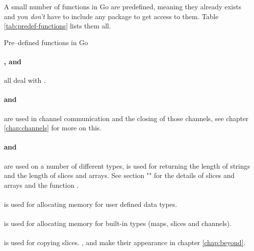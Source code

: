 A small number of functions in Go are predefined, meaning they already
exists and you \emph{don't} have to include any package to get
access to them. Table \ref{tab:predef-functions} lists them all.

\begin{table}[H]
\begin{center}
\caption{Pre--defined functions in Go}
\label{tab:predef-functions}

\end{center}
\end{table}

\paragraph{,  and } all deal with
.

\paragraph{ and } are used in
channel communication and the closing of those channels, see chapter \ref{chap:channels}
for more on this.

\paragraph{ and } are used on a number of different
types,  is
used for returning the length of strings and the length of slices and
arrays. See section "" for the details of slices and
arrays and the function .

\paragraph{} is used for allocating memory for user defined
data types.

\paragraph{} is used for allocating memory for built-in
types (maps, slices and channels).

\paragraph{} is used for copying slices. ,
 and  make their appearance in chapter
\ref{chap:beyond}.

